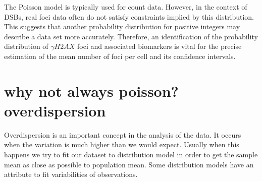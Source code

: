 The Poisson model is typically used for count data. However, in the context of DSBs, real foci data often do not satisfy constraints implied by this distribution. This suggests that another probability distribution for positive integers may describe a data set more accurately. Therefore, an identification of the probability distribution of $\gamma H2AX$ foci and associated biomarkers is vital for the precise estimation of the mean number of foci per cell and its confidence intervals.


\section{why not always poisson? overdispersion}

Overdispersion is an important concept in the analysis of the data. It occurs when the variation is much higher than we would expect. Usually when this happens we try to fit our dataset to distribution model in order to get the sample mean as close as possible to population mean. Some distribution models have an attribute to fit variabilities of observations.


